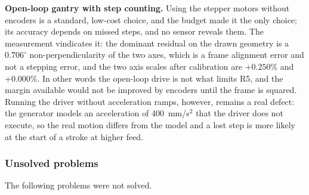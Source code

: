         \textbf{Open-loop gantry with step counting.}
        Using the stepper motors without encoders is a standard, low-cost choice, and the budget made it the only choice; its accuracy depends on missed steps, and no sensor reveals them.
        The measurement vindicates it: the dominant residual on the drawn geometry is a $0.706^{\circ}$ non-perpendicularity of the two axes, which is a frame alignment error and not a stepping error, and the two axis scales after calibration are $+0.250\%$ and $+0.000\%$.
        In other words the open-loop drive is not what limits R5, and the margin available would not be improved by encoders until the frame is squared.
        Running the driver without acceleration ramps, however, remains a real defect: the generator models an acceleration of 400~mm/s$^2$ that the driver does not execute, so the real motion differs from the model and a lost step is more likely at the start of a stroke at higher feed.


    \subsubsection{Unsolved problems}
    \label{sec:dis-unsolved}

        The following problems were not solved.

